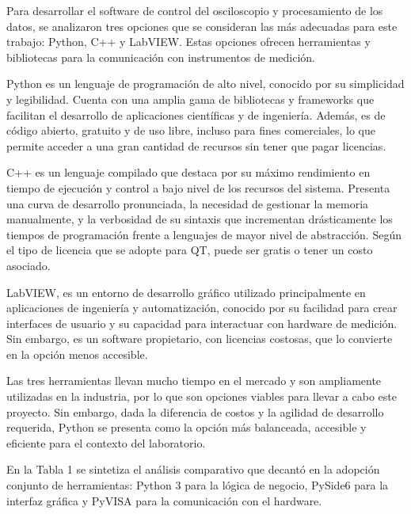 Para desarrollar el software de control del osciloscopio y procesamiento de los datos, se analizaron tres opciones que se consideran las más adecuadas para este trabajo: Python, C++ y LabVIEW. Estas opciones ofrecen herramientas y bibliotecas para la comunicación con instrumentos de medición.\par
Python es un lenguaje de programación de alto nivel, conocido por su simplicidad y legibilidad. Cuenta con una amplia gama de bibliotecas y frameworks que facilitan el desarrollo de aplicaciones científicas y de ingeniería. Además, es de código abierto, gratuito y de uso libre, incluso para fines comerciales, lo que permite acceder a una gran cantidad de recursos sin tener que pagar licencias.\par
C++ es un lenguaje compilado que destaca por su máximo rendimiento en tiempo de ejecución y control a bajo nivel de los recursos del sistema. Presenta una curva de desarrollo pronunciada, la necesidad de gestionar la memoria manualmente, y la verbosidad de su sintaxis que incrementan drásticamente los tiempos de programación frente a lenguajes de mayor nivel de abstracción. Según el tipo de licencia que se adopte para QT, puede ser gratis o tener un costo asociado.\par
LabVIEW, es un entorno de desarrollo gráfico utilizado principalmente en aplicaciones de ingeniería y automatización, conocido por su facilidad para crear interfaces de usuario y su capacidad para interactuar con hardware de medición. Sin embargo, es un software propietario, con licencias costosas, que lo convierte en la opción menos accesible.\par
Las tres herramientas llevan mucho tiempo en el mercado y son ampliamente utilizadas en la industria, por lo que son opciones viables para llevar a cabo este proyecto. Sin embargo, dada la diferencia de costos y la agilidad de desarrollo requerida, Python se presenta como la opción más balanceada, accesible y eficiente para el contexto del laboratorio.\par
En la Tabla 1 se sintetiza el análisis comparativo que decantó en la adopción conjunto de herramientas: Python 3 para la lógica de negocio, PySide6 para la interfaz gráfica y PyVISA para la comunicación con el hardware.\par

